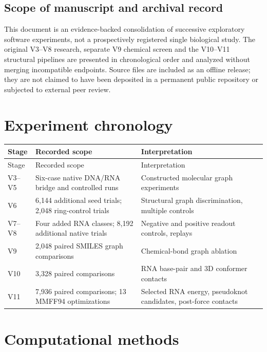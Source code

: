 \documentclass[11pt,a4paper]{article}
\begin{document}
\subsection{Scope of manuscript and archival record}
This document is an evidence-backed consolidation of successive exploratory software experiments, not a prospectively registered single biological study. The original V3--V8 research, separate V9 chemical screen and the V10--V11 structural pipelines are presented in chronological order and analyzed without merging incompatible endpoints. Source files are included as an offline release; they are not claimed to have been deposited in a permanent public repository or subjected to external peer review.

\section{Experiment chronology}

\begin{center}\small\begin{longtable}{lll}
\toprule
Stage & Recorded scope & Interpretation\\
\midrule
\endfirsthead
\toprule
Stage & Recorded scope & Interpretation\\
\midrule
\endhead
V3--V5 & Six-case native DNA/RNA bridge and controlled runs & Constructed molecular graph experiments\\
V6 & 6,144 additional seed trials; 2,048 ring-control trials & Structural graph discrimination, multiple controls\\
V7--V8 & Four added RNA classes; 8,192 additional native trials & Negative and positive readout controls, replays\\
V9 & 2,048 paired SMILES graph comparisons & Chemical-bond graph ablation\\
V10 & 3,328 paired comparisons & RNA base-pair and 3D conformer contacts\\
V11 & 7,936 paired comparisons; 13 MMFF94 optimizations & Selected RNA energy, pseudoknot candidates, post-force contacts\\
\bottomrule
\end{longtable}
\end{center}
\section{Computational methods}
\end{document}
